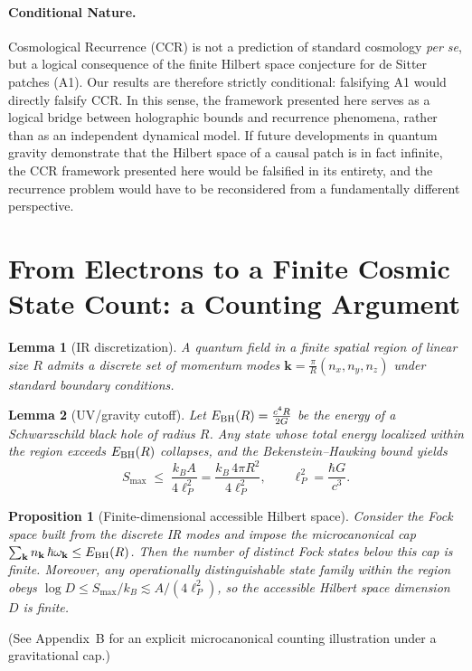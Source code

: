 \documentclass[12pt]{article}
\newtheorem{lemma}{Lemma}
\newtheorem{proposition}{Proposition}
\theoremstyle{remark}
\begin{document}
\paragraph{Conditional Nature.} 
Cosmological Recurrence (CCR) is not a prediction of standard cosmology \emph{per se}, but a logical consequence of the finite Hilbert space conjecture for de Sitter patches (A1). Our results are therefore strictly conditional: falsifying A1 would directly falsify CCR. In this sense, the framework presented here serves as a logical bridge between holographic bounds and recurrence phenomena, rather than as an independent dynamical model. If future developments in quantum gravity demonstrate that the Hilbert space of a causal patch is in fact infinite, the CCR framework presented here would be falsified in its entirety, and the recurrence problem would have to be reconsidered from a fundamentally different perspective.

\section{From Electrons to a Finite Cosmic State Count: a Counting Argument}
\begin{lemma}[IR discretization]\label{lem:IR}
A quantum field in a finite spatial region of linear size $R$ admits a discrete set of momentum modes
$\mathbf{k}=\frac{\pi}{R}(n_x,n_y,n_z)$ under standard boundary conditions.
\end{lemma}

\begin{lemma}[UV/gravity cutoff]\label{lem:UV}
Let $E_{\rm BH}(R)=\frac{c^4 R}{2G}$ be the energy of a Schwarzschild black hole of radius $R$. 
Any state whose total energy localized within the region exceeds $E_{\rm BH}(R)$ collapses, and the
Bekenstein--Hawking bound yields
\begin{equation}
S_{\max}\;\le\; \frac{k_B A}{4\ell_P^2}
=\frac{k_B\,4\pi R^2}{4\ell_P^2},\qquad \ell_P^2=\frac{\hbar G}{c^3}.
\end{equation}
\end{lemma}

\begin{proposition}[Finite-dimensional accessible Hilbert space]\label{prop:finiteD}
Consider the Fock space built from the discrete IR modes and impose the microcanonical cap 
$\sum_{\mathbf{k}} n_{\mathbf{k}}\,\hbar\omega_{\mathbf{k}}\le E_{\rm BH}(R)$. 
Then the number of distinct Fock states below this cap is finite. 
Moreover, any operationally distinguishable state family within the region obeys 
$\log D \le S_{\max}/k_B \lesssim A/(4\ell_P^2)$, so the accessible Hilbert space dimension $D$ is finite.
\end{proposition}
\noindent(See Appendix~B for an explicit microcanonical counting illustration under a gravitational cap.)
\end{document}
